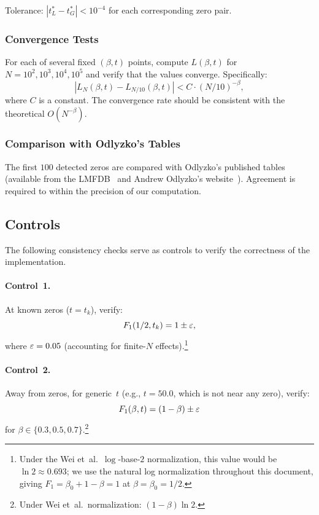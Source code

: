 Tolerance: $|t^*_L - t^*_G| < 10^{-4}$ for each corresponding zero pair.

\subsubsection{Convergence Tests}
\label{sec:conv-tests}

For each of several fixed $(\beta, t)$ points, compute $L(\beta, t)$ for
$N = 10^2, 10^3, 10^4, 10^5$ and verify that the values converge. Specifically:
\begin{equation}\label{eq:conv-test}
  |L_N(\beta, t) - L_{N/10}(\beta, t)| < C \cdot (N/10)^{-\beta},
\end{equation}
where $C$ is a constant. The convergence rate should be consistent with the theoretical
$O(N^{-\beta})$.

\subsubsection{Comparison with Odlyzko's Tables}
\label{sec:odlyzko-compare}

The first $100$ detected zeros are compared with Odlyzko's published tables (available
from the LMFDB~\cite{lmfdb} and Andrew Odlyzko's
website~\cite{odlyzko1989,odlyzko2001}). Agreement is required to within the precision
of our computation.


\subsection{Controls}
\label{sec:controls}

The following consistency checks serve as controls to verify the correctness of the
implementation.

\paragraph{Control~1.}
At known zeros ($t = t_k$), verify:
\begin{equation}\label{eq:control1}
  F_1(1/2, t_k) = 1 \pm \varepsilon,
\end{equation}
where $\varepsilon = 0.05$ (accounting for finite-$N$ effects).\footnote{Under the Wei et~al.\
$\log$-base-$2$ normalization, this value would be $\ln 2 \approx 0.693$; we use the
natural log normalization throughout this document, giving
$F_1 = \beta_0 + 1 - \beta = 1$ at $\beta = \beta_0 = 1/2$.}

\paragraph{Control~2.}
Away from zeros, for generic~$t$ (e.g., $t = 50.0$, which is not near any zero), verify:
\begin{equation}\label{eq:control2}
  F_1(\beta, t) = (1 - \beta) \pm \varepsilon
\end{equation}
for $\beta \in \{0.3, 0.5, 0.7\}$.\footnote{Under Wei et~al.\ normalization:
$(1 - \beta)\ln 2$.}

